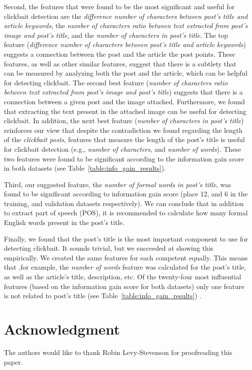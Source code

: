 \documentclass{sig-alternate}
\begin{document}
Second, the features that were found to be the most significant and useful for clickbait detection are the \emph{difference number of characters between post's title and article keywords}, the \emph{number of characters ratio between text extracted from post's image and post's title}, and the \emph{number of characters in post's title}.
The top feature (\emph{difference number of characters between post's title and article keywords}) suggests a connection between the post and the article the post points.
These features, as well as other similar  features, suggest that there is a subtlety that can be measured by analyzing both the post and the article, which can be helpful for detecting clickbait.
The second best feature (\emph{number of characters ratio between text extracted from post's image and post's title}) suggests that there is a connection between a given post and the image attached. 
Furthermore, we found that extracting the text present in the attached image can be useful for detecting clickbait.
In addition, the next best feature (\emph{number of characters in post's title}) reinforces our view that despite the contradiction we found regarding the length of the \emph{clickbait posts}, features that measure the length of the post's title is useful for clickbait detection (e.g., \emph{number of characters}, and \emph{number of words}).
These two features were found to be significant according to the information gain score in both datasets (see Table~\ref{table:info_gain_results}).    

Third, our suggested feature, the \emph{number of formal words in post's title}, was found to be significant according to information gain score (place 12, and 6 in the training, and validation datasets respectively).
We can conclude that in addition to extract part of speech (POS), it is recommended to calculate how many formal English words present in the post's title.   

Finally, we found that the post's title is the most important component to use for detecting clickbait.
It sounds trivial, but we succeeded at showing this empirically.  
We created the same features for each competent equally.
This means that ,for example, the \emph{number of words} feature was calculated for the post's title, as well as the article's title, description, etc.
Of the twenty-four most influential features (based on the information gain score for both datasets) only one feature is not related to post's title (see Table~\ref{table:info_gain_results}) .


\section*{Acknowledgment}
The authors would like to thank Robin Levy-Stevenson for proofreading this paper.


\begin{raggedright}

\end{raggedright}
\end{document}
